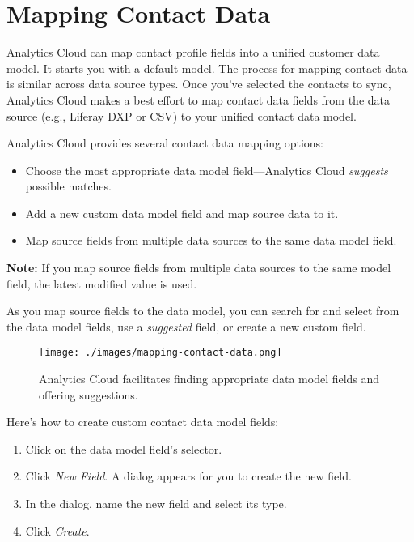 \section{Mapping Contact Data}\label{mapping-contact-data}

Analytics Cloud can map contact profile fields into a unified customer
data model. It starts you with a default model. The process for mapping
contact data is similar across data source types. Once you've selected
the contacts to sync, Analytics Cloud makes a best effort to map contact
data fields from the data source (e.g., Liferay DXP or CSV) to your
unified contact data model.

Analytics Cloud provides several contact data mapping options:

\begin{itemize}
\item
  Choose the most appropriate data model field---Analytics Cloud
  \emph{suggests} possible matches.
\item
  Add a new custom data model field and map source data to it.
\item
  Map source fields from multiple data sources to the same data model
  field.
\end{itemize}

\textbf{Note:} If you map source fields from multiple data sources to
the same model field, the latest modified value is used.

As you map source fields to the data model, you can search for and
select from the data model fields, use a \emph{suggested} field, or
create a new custom field.

\begin{figure}
\centering
\texttt{[image: ./images/mapping-contact-data.png]}
\caption{Analytics Cloud facilitates finding appropriate data model
fields and offering suggestions.}
\end{figure}

Here's how to create custom contact data model fields:

\begin{enumerate}
\def\labelenumi{\arabic{enumi}.}
\item
  Click on the data model field's selector.
\item
  Click \emph{New Field}. A dialog appears for you to create the new
  field.
\item
  In the dialog, name the new field and select its type.
\item
  Click \emph{Create}.
\end{enumerate}

